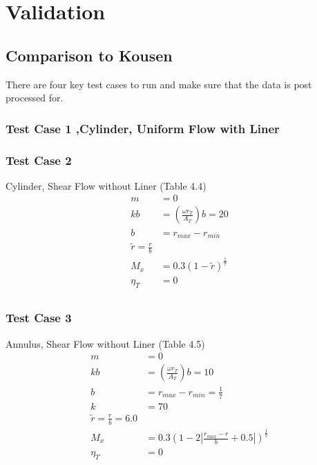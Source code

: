 \documentclass[12pt]{uthesis-v12}  %
\begin{document}
\section{Validation}
\subsection{Comparison to Kousen}


There are four key test cases to run and make sure that the data is post processed 
for.

\subsubsection{Test Case 1 ,Cylinder, Uniform Flow with Liner}
% 
\subsubsection{Test Case 2}
Cylinder, Shear Flow without Liner (Table 4.4)
\begin{align*}
    m &= 0 \\
    kb &= \left(\frac{\omega r_T}{A_T}\right)b = 20 \\
    b &= r_{max} - r_{min} \\
    \tilde{r} = \frac{r}{b} \\
    M_x &= 0.3(1-\tilde{r})^{\frac{1}{7}} \\
    \eta_T &= 0\\
\end{align*}

% 
\subsubsection{Test Case 3}
Annulus, Shear Flow without Liner (Table 4.5)
\begin{align*}
    m &= 0 \\
    kb &= \left(\frac{\omega r_T}{A_T}\right)b = 10 \\
    b &= r_{max} - r_{min}  = \frac{1}{7}\\
    k &= 70 \\
    \tilde{r} = \frac{r}{b} = 6.0 \\
    M_x &= 0.3\left(1 - 2 \left| \frac{r_{max}-r}{b} + 0.5 \right|  \right)^{\frac{1}{7}} \\
    \eta_T &= 0\\
\end{align*}
\end{document}
